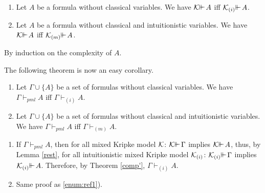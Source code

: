 \documentclass{jancl}
\begin{document}
\begin{lemma} \label{rest}
\begin{enumerate}
\item Let $A$ be a formula without classical variables. We have
${\cal K} {\ifmmode{ {\vdash}\mkern-7.6mu
{\vdash}\mkern2mu}\else{ {\vdash}\kern-.28em
{\vdash}\hskip1pt\ }\fi\relax} A$ iff ${\cal K}_{(i)} {\ifmmode{ {\vdash}\mkern-7.6mu
{\vdash}\mkern2mu}\else{ {\vdash}\kern-.28em
{\vdash}\hskip1pt\ }\fi\relax} A$.

\item Let $A$ be a formula without classical and intuitionistic
variables.  We have ${\cal K} {\ifmmode{ {\vdash}\mkern-7.6mu
{\vdash}\mkern2mu}\else{ {\vdash}\kern-.28em
{\vdash}\hskip1pt\ }\fi\relax} A$ iff ${\cal K}_{(m)}
{\ifmmode{ {\vdash}\mkern-7.6mu
{\vdash}\mkern2mu}\else{ {\vdash}\kern-.28em
{\vdash}\hskip1pt\ }\fi\relax} A$.
\end{enumerate}
\end{lemma}

\begin{proof*}
By induction on the complexity of $A$.
\end{proof*}

The following theorem is now an easy corollary.
\begin{theorem} \label{imp}
\begin{enumerate}
\item Let ${\Gamma} \cup \{ A \}$ be a set of formulas without classical
variables. We have ${\Gamma} {\vdash}_{pml} A$ iff ${\Gamma} {\vdash}_{(i)} A$.

\item Let ${\Gamma} \cup \{ A \}$ be a set of formulas without classical
and intuitionistic variables.  We have ${\Gamma} {\vdash}_{pml} A$ iff ${\Gamma}
{\vdash}_{(m)} A$.
\end{enumerate}
\end{theorem}

\begin{proof*}
\begin{enumerate}
\item If ${\Gamma} {\vdash}_{pml} A$, then for all  mixed Kripke model ${\cal
K}$: ${\cal K} {\ifmmode{ {\vdash}\mkern-7.6mu
{\vdash}\mkern2mu}\else{ {\vdash}\kern-.28em
{\vdash}\hskip1pt\ }\fi\relax} {\Gamma}$ implies ${\cal K} {\ifmmode{ {\vdash}\mkern-7.6mu
{\vdash}\mkern2mu}\else{ {\vdash}\kern-.28em
{\vdash}\hskip1pt\ }\fi\relax} A$, thus,
by Lemma \ref{rest}, for all intuitionistic mixed Kripke model
${\cal K}_{(i)}$: ${\cal K}_{(i)} {\ifmmode{ {\vdash}\mkern-7.6mu
{\vdash}\mkern2mu}\else{ {\vdash}\kern-.28em
{\vdash}\hskip1pt\ }\fi\relax} {\Gamma}$ implies ${\cal
K}_{(i)} {\ifmmode{ {\vdash}\mkern-7.6mu
{\vdash}\mkern2mu}\else{ {\vdash}\kern-.28em
{\vdash}\hskip1pt\ }\fi\relax} A$. Therefore, by Theorem \ref{comp'}, ${\Gamma}
{\vdash}_{(i)} A$.\label{enum:ref1}

\item Same proof as \ref{enum:ref1}).
\end{enumerate}
\vspace*{-1em}
\end{proof*}
\end{document}

